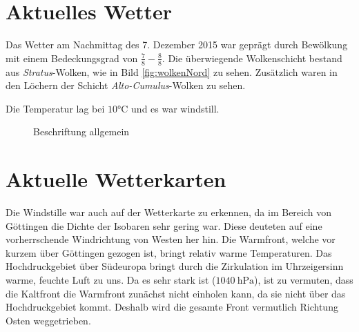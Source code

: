 \documentclass[12pt,a4paper,titlepage,headinclude,bibtotoc]{scrartcl}
\begin{document}
\section{Aktuelles Wetter}
Das Wetter am Nachmittag des 7. Dezember 2015 war geprägt durch Bewölkung mit einem Bedeckungsgrad von $\frac{7}{8}-\frac{8}{8}$.
Die überwiegende Wolkenschicht bestand aus \textit{Stratus}-Wolken, wie in Bild \ref{fig:wolkenNord} zu sehen.
Zusätzlich waren in den Löchern der Schicht \textit{Alto-Cumulus}-Wolken zu sehen.

Die Temperatur lag bei $10\si\celsius$ und es war windstill.

\begin{figure}[h]
  \centering
  \hfill
  \caption{Beschriftung allgemein}
  \label{fig:label-gesamt}
\end{figure}

\section{Aktuelle Wetterkarten}
Die Windstille war auch auf der Wetterkarte zu erkennen, da im Bereich von Göttingen die Dichte der Isobaren sehr gering war.
Diese deuteten auf eine vorherrschende Windrichtung von Westen her hin.
Die Warmfront, welche vor kurzem über Göttingen gezogen ist, bringt relativ warme Temperaturen.
Das Hochdruckgebiet über Südeuropa bringt durch die Zirkulation im Uhrzeigersinn warme, feuchte Luft zu uns.
Da es sehr stark ist ($\SI{1040}{\hecto\pascal}$), ist zu vermuten, dass die Kaltfront die Warmfront zunächst nicht einholen kann, da sie nicht über das Hochdruckgebiet kommt.
Deshalb wird die gesamte Front vermutlich Richtung Osten weggetrieben.
\end{document}
